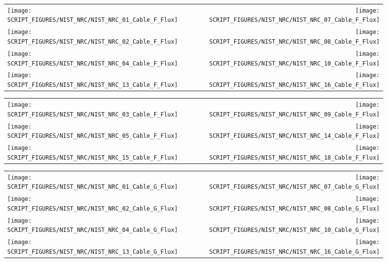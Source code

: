 \begin{figure}[p]
\begin{tabular*}{\textwidth}{l@{\extracolsep{\fill}}r}
\texttt{[image: SCRIPT\_FIGURES/NIST\_NRC/NIST\_NRC\_01\_Cable\_F\_Flux]} &
\texttt{[image: SCRIPT\_FIGURES/NIST\_NRC/NIST\_NRC\_07\_Cable\_F\_Flux]} \\
\texttt{[image: SCRIPT\_FIGURES/NIST\_NRC/NIST\_NRC\_02\_Cable\_F\_Flux]} &
\texttt{[image: SCRIPT\_FIGURES/NIST\_NRC/NIST\_NRC\_08\_Cable\_F\_Flux]} \\
\texttt{[image: SCRIPT\_FIGURES/NIST\_NRC/NIST\_NRC\_04\_Cable\_F\_Flux]} &
\texttt{[image: SCRIPT\_FIGURES/NIST\_NRC/NIST\_NRC\_10\_Cable\_F\_Flux]} \\
\texttt{[image: SCRIPT\_FIGURES/NIST\_NRC/NIST\_NRC\_13\_Cable\_F\_Flux]} &
\texttt{[image: SCRIPT\_FIGURES/NIST\_NRC/NIST\_NRC\_16\_Cable\_F\_Flux]}
\end{tabular*}
\label{NIST_NRC_Cable_F_Flux_Closed}
\end{figure}

\begin{figure}[p]
\begin{tabular*}{\textwidth}{l@{\extracolsep{\fill}}r}
\texttt{[image: SCRIPT\_FIGURES/NIST\_NRC/NIST\_NRC\_03\_Cable\_F\_Flux]} &
\texttt{[image: SCRIPT\_FIGURES/NIST\_NRC/NIST\_NRC\_09\_Cable\_F\_Flux]} \\
\texttt{[image: SCRIPT\_FIGURES/NIST\_NRC/NIST\_NRC\_05\_Cable\_F\_Flux]} &
\texttt{[image: SCRIPT\_FIGURES/NIST\_NRC/NIST\_NRC\_14\_Cable\_F\_Flux]} \\
\texttt{[image: SCRIPT\_FIGURES/NIST\_NRC/NIST\_NRC\_15\_Cable\_F\_Flux]} &
\texttt{[image: SCRIPT\_FIGURES/NIST\_NRC/NIST\_NRC\_18\_Cable\_F\_Flux]}
\end{tabular*}
\label{NIST_NRC_Cable_F_Flux_Open}
\end{figure}

\begin{figure}[p]
\begin{tabular*}{\textwidth}{l@{\extracolsep{\fill}}r}
\texttt{[image: SCRIPT\_FIGURES/NIST\_NRC/NIST\_NRC\_01\_Cable\_G\_Flux]} &
\texttt{[image: SCRIPT\_FIGURES/NIST\_NRC/NIST\_NRC\_07\_Cable\_G\_Flux]} \\
\texttt{[image: SCRIPT\_FIGURES/NIST\_NRC/NIST\_NRC\_02\_Cable\_G\_Flux]} &
\texttt{[image: SCRIPT\_FIGURES/NIST\_NRC/NIST\_NRC\_08\_Cable\_G\_Flux]} \\
\texttt{[image: SCRIPT\_FIGURES/NIST\_NRC/NIST\_NRC\_04\_Cable\_G\_Flux]} &
\texttt{[image: SCRIPT\_FIGURES/NIST\_NRC/NIST\_NRC\_10\_Cable\_G\_Flux]} \\
\texttt{[image: SCRIPT\_FIGURES/NIST\_NRC/NIST\_NRC\_13\_Cable\_G\_Flux]} &
\texttt{[image: SCRIPT\_FIGURES/NIST\_NRC/NIST\_NRC\_16\_Cable\_G\_Flux]}
\end{tabular*}
\label{NIST_NRC_Cable_G_Flux_Closed}
\end{figure}

